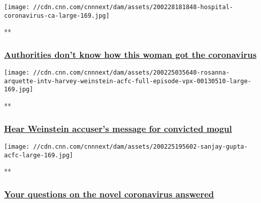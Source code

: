 \href{/videos/health/2020/02/28/coronavirus-california-italy-china-korea-acfc-full-episode-vpx.cnn/video/playlists/acfc-full-episodes/}{}

\texttt{[image: //cdn.cnn.com/cnnnext/dam/assets/200228181848-hospital-coronavirus-ca-large-169.jpg]}

**

\hypertarget{authorities-dont-know-how-this-woman-got-the-coronavirus-}{%
\subsubsection{\texorpdfstring{\href{/videos/health/2020/02/28/coronavirus-california-italy-china-korea-acfc-full-episode-vpx.cnn/video/playlists/acfc-full-episodes/}{Authorities
don't know how this woman got the coronavirus
}}{Authorities don't know how this woman got the coronavirus }}\label{authorities-dont-know-how-this-woman-got-the-coronavirus-}}

\href{/videos/us/2020/02/25/rosanna-arquette-intv-harvey-weinstein-acfc-full-episode-vpx.cnn/video/playlists/acfc-full-episodes/}{}

\texttt{[image: //cdn.cnn.com/cnnnext/dam/assets/200225035640-rosanna-arquette-intv-harvey-weinstein-acfc-full-episode-vpx-00130510-large-169.jpg]}

**

\hypertarget{hear-weinstein-accusers-message-for-convicted-mogul}{%
\subsubsection{\texorpdfstring{\href{/videos/us/2020/02/25/rosanna-arquette-intv-harvey-weinstein-acfc-full-episode-vpx.cnn/video/playlists/acfc-full-episodes/}{Hear
Weinstein accuser's message for convicted
mogul}}{Hear Weinstein accuser's message for convicted mogul}}\label{hear-weinstein-accusers-message-for-convicted-mogul}}

\href{/videos/health/2020/02/25/coronavirus-gupta-questions-community-spread-acfc-full-episode-vpx.cnn/video/playlists/acfc-full-episodes/}{}

\texttt{[image: //cdn.cnn.com/cnnnext/dam/assets/200225195602-sanjay-gupta-acfc-large-169.jpg]}

**

\hypertarget{your-questions-on-the-novel-coronavirus-answered-}{%
\subsubsection{\texorpdfstring{\href{/videos/health/2020/02/25/coronavirus-gupta-questions-community-spread-acfc-full-episode-vpx.cnn/video/playlists/acfc-full-episodes/}{Your
questions on the novel coronavirus answered
}}{Your questions on the novel coronavirus answered }}\label{your-questions-on-the-novel-coronavirus-answered-}}

